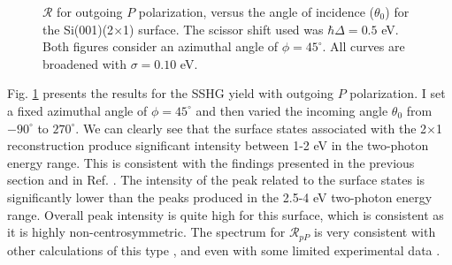 \begin{figure}[h]
\centering
{}\hfill
{}
\caption{$\mathcal{R}$ for outgoing $P$ polarization, versus the angle of
incidence ($\theta_{0}$) for the Si(001)(2$\times$1) surface. The scissor shift
used was $\hbar\Delta = 0.5$ eV. Both figures consider an azimuthal angle of
$\phi = 45^{\circ}$. All curves are broadened with $\sigma = 0.10$ eV.}
\label{fig:2x1rP3d}
\end{figure}

Fig. \ref{fig:2x1rP3d} presents the results for the SSHG yield with outgoing $P$
polarization. I set a fixed azimuthal angle of $\phi = 45^{\circ}$ and then
varied the incoming angle $\theta_{0}$ from $-90^{\circ}$ to $270^{\circ}$. We
can clearly see that the surface states associated with the 2$\times$1
reconstruction produce significant intensity between 1-2 eV in the two-photon
energy range. This is consistent with the findings presented in the previous
section and in Ref. \cite{andersonPRB15}. The intensity of the peak related to
the surface states is significantly lower than the peaks produced in the 2.5-4
eV two-photon energy range. Overall peak intensity is quite high for this
surface, which is consistent as it is highly non-centrosymmetric. The spectrum
for $\mathcal{R}_{pP}$ is very consistent with other calculations of this type
\cite{tancognedejean:tel-01235611}, and even with some limited experimental data
\cite{powerPRL95}.

